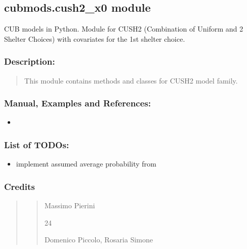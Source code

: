 \documentclass[letterpaper,10pt,english]{sphinxmanual}
\begin{document}
\subsection{cubmods.cush2\_x0 module}
\label{\detokenize{cubmods:module-cubmods.cush2_x0}}\label{\detokenize{cubmods:cubmods-cush2-x0-module}}\label{\detokenize{cubmods:cush2x0-module}}
\sphinxAtStartPar
CUB models in Python.
Module for CUSH2 (Combination of Uniform
and 2 Shelter Choices) with covariates
for the 1st shelter choice.


\subsubsection{Description:}
\label{\detokenize{cubmods:id53}}\begin{quote}

\sphinxAtStartPar
This module contains methods and classes
for CUSH2 model family.
\end{quote}


\subsubsection{Manual, Examples and References:}
\label{\detokenize{cubmods:id54}}\begin{itemize}
\item {} 
\sphinxAtStartPar
{}

\end{itemize}


\subsubsection{List of TODOs:}
\label{\detokenize{cubmods:id55}}\begin{itemize}
\item {} 
\sphinxAtStartPar
implement assumed average probability from 

\end{itemize}


\subsubsection{Credits}
\label{\detokenize{cubmods:id56}}\begin{quote}
\begin{quote}\begin{description}
\sphinxAtStartPar
Massimo Pierini

\sphinxhyphen{}24

\sphinxAtStartPar
Domenico Piccolo, Rosaria Simone

\sphinxAtStartPar
{}

\end{description}\end{quote}
\end{quote}
\end{document}
